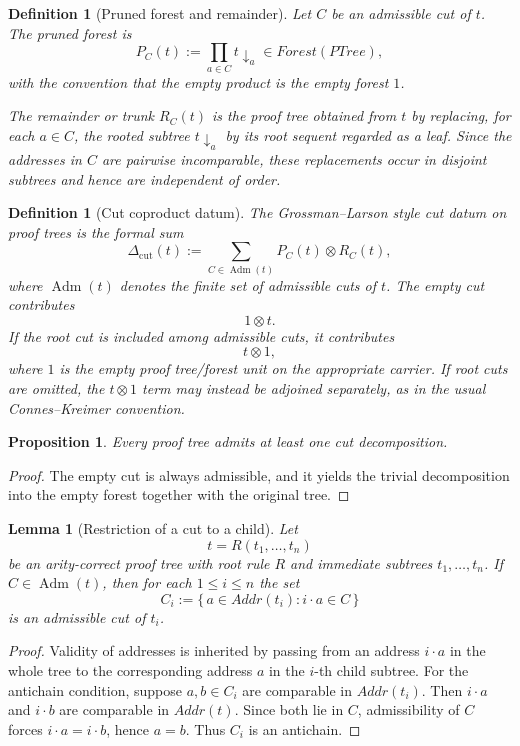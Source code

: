 \documentclass[11pt]{article}
\newtheorem{proposition}[theorem]{Proposition}
\newtheorem{lemma}[theorem]{Lemma}
\newtheorem{definition}[theorem]{Definition}
\newcommand{\PTree}{\mathit{PTree}}
\newcommand{\Forest}{\mathit{Forest}}
\newcommand{\Addr}{\mathit{Addr}}
\begin{document}
\begin{definition}[Pruned forest and remainder]
Let \(C\) be an admissible cut of \(t\). The \emph{pruned forest} is
\[
P_C(t):=\prod_{a\in C} t\downarrow_a
\in \Forest(\PTree),
\]
with the convention that the empty product is the empty forest \(1\).

The \emph{remainder} or \emph{trunk} \(R_C(t)\) is the proof tree obtained
from \(t\) by replacing, for each \(a\in C\), the rooted subtree
\(t\downarrow_a\) by its root sequent regarded as a leaf. Since the addresses
in \(C\) are pairwise incomparable, these replacements occur in disjoint
subtrees and hence are independent of order.
\end{definition}

\begin{definition}[Cut coproduct datum]
The Grossman--Larson style cut datum on proof trees is the formal sum
\[
\Delta_{\mathrm{cut}}(t)
:=
\sum_{C\in \operatorname{Adm}(t)}
P_C(t)\otimes R_C(t),
\]
where \(\operatorname{Adm}(t)\) denotes the finite set of admissible cuts of
\(t\). The empty cut contributes
\[
1\otimes t.
\]
If the root cut is included among admissible cuts, it contributes
\[
t\otimes 1,
\]
where \(1\) is the empty proof tree/forest unit on the appropriate carrier.
If root cuts are omitted, the \(t\otimes 1\) term may instead be adjoined
separately, as in the usual Connes--Kreimer convention.
\end{definition}

\begin{proposition}
Every proof tree admits at least one cut decomposition.
\end{proposition}

\begin{proof}
The empty cut is always admissible, and it yields the trivial decomposition
into the empty forest together with the original tree.
\end{proof}

\begin{lemma}[Restriction of a cut to a child]
Let
\[
t=R(t_1,\ldots,t_n)
\]
be an arity-correct proof tree with root rule \(R\) and immediate subtrees
\(t_1,\ldots,t_n\). If \(C\in\operatorname{Adm}(t)\), then for each
\(1\le i\le n\) the set
\[
C_i:=\{\,a\in\Addr(t_i): i\cdot a\in C\,\}
\]
is an admissible cut of \(t_i\).
\end{lemma}

\begin{proof}
Validity of addresses is inherited by passing from an address \(i\cdot a\) in
the whole tree to the corresponding address \(a\) in the \(i\)-th child
subtree. For the antichain condition, suppose \(a,b\in C_i\) are comparable in
\(\Addr(t_i)\). Then \(i\cdot a\) and \(i\cdot b\) are comparable in
\(\Addr(t)\). Since both lie in \(C\), admissibility of \(C\) forces
\(i\cdot a=i\cdot b\), hence \(a=b\). Thus \(C_i\) is an antichain.
\end{proof}
\end{document}
